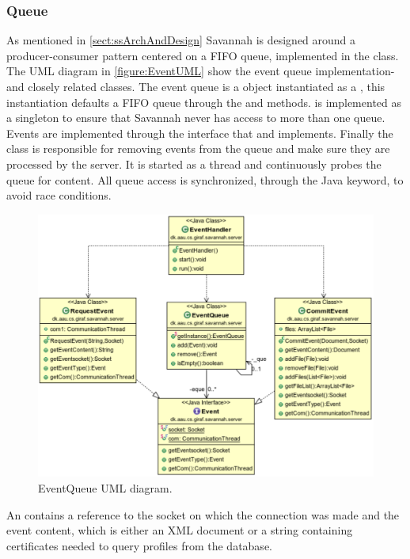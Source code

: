 \subsubsection{Queue}

As mentioned in \autoref{sect:ssArchAndDesign} Savannah is designed around a producer-consumer pattern centered on a FIFO queue, implemented in the  class.
The UML diagram in \autoref{figure:EventUML} show the event queue implementation- and closely related classes.
The event queue is a  object instantiated as a , this instantiation defaults a FIFO queue through
the  and  methods.  is implemented as a singleton to ensure that Savannah never has access to more than one queue.
Events are implemented through the  interface that  and  implements.
Finally the  class is responsible for removing events from the queue and make sure they are processed by the server. It is started as a thread and
continuously probes the queue for content. All queue access is synchronized, through the Java  keyword, to avoid race conditions.

\begin{figure}[H]
 \centering
  \includegraphics[scale=0.65]{images/EventQueue}
  \caption{EventQueue UML diagram.}
  \label{figure:EventUML}
\end{figure}

An  contains a reference to the socket on which the connection was made and the event content, which is either an XML document or a string containing certificates
needed to query profiles from the database.
